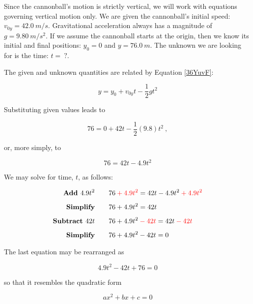 \documentclass[dvipsnames]{article}
\numberwithin{equation}{section}
\numberwithin{figure}{section}
\begin{document}
\Solution Since the cannonball's motion is strictly vertical, we will work with equations governing vertical motion only. We are given the cannonball's initial speed: $v_{0y} = \SI{42.0}{m/s}$. Gravitational acceleration always has a magnitude of $g = \SI{9.80}{m/s^2}$. If we assume the cannonball starts at the origin, then we know its initial and final positions: $y_0 = 0$ and $y = \SI{76.0}{m}$. The unknown we are looking for is the time: $t =\ ?$.

\vspace{1em}

The given and unknown quantities are related by Equation \eqref{36YuvF}:

\begin{equation*}
    y = y_0 + v_{0y}t - \frac{1}{2}  g t^2
\end{equation*}

Substituting given values leads to 

\begin{equation*}
    76 =  0 + 42 t -\frac{1}{2}(9.8) t^2\ ,
\end{equation*}

or, more simply, to

\begin{equation*}
    76 = 42 t - 4.9 t^2
\end{equation*}

We may solve for time, $t$, as follows:

\begin{align*}
    \textbf{Add $4.9 t^2$} \qquad & 76 \mathbin{\color{red} +} \textcolor{red}{4.9 t^2} = 42 t - 4.9 t^2 \mathbin{\color{red} +} \textcolor{red}{4.9 t^2}\\[1ex]
    \textbf{Simplify} \qquad & 76 + 4.9 t^2 = 42 t\\[1ex]
    \textbf{Subtract $42 t$} \qquad & 76 + 4.9 t^2 \mathbin{\color{red} -} \textcolor{red}{42 t} = 42 t \mathbin{\color{red} -} \textcolor{red}{42 t}\\[1ex]
    \textbf{Simplify} \qquad & 76 + 4.9 t^2 - 42 t = 0
\end{align*}

The last equation may be rearranged as 

\begin{equation} \label{LScbXD}
    4.9 t^2 - 42 t + 76 = 0
\end{equation}

so that it resembles the quadratic form

\begin{equation} \label{WsGUny}
    ax^2 + bx + c = 0
\end{equation}
\end{document}
